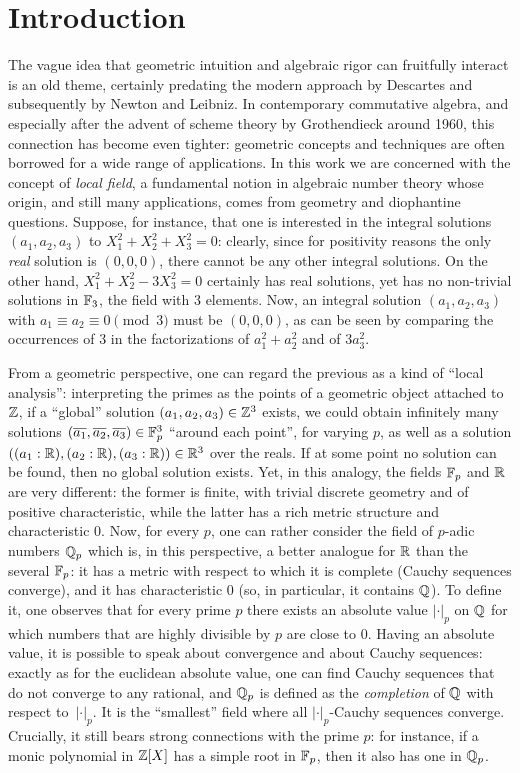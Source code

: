 \documentclass[sigplan,10pt, nonacm, review]{acmart}
\begin{document}
\section{Introduction}\label{sec:intro}
The vague idea that geometric intuition and algebraic rigor can fruitfully interact is an old theme, certainly predating the modern approach by Descartes and subsequently by Newton and Leibniz. 
In contemporary commutative algebra, and especially
after the advent of scheme theory by Grothendieck around 1960, this connection has become even tighter: geometric concepts and techniques are often borrowed for a wide range of applications. In this work we are concerned with the concept of \emph{local field}, a fundamental notion in algebraic number theory whose origin, and still many applications, comes from geometry and diophantine questions. Suppose, for instance, that one is interested in the integral solutions $(a_1,a_2,a_3)$ to $X_1^2+X_2^2+X_3^2=0$: clearly, since for positivity reasons the only \emph{real} solution is $(0,0,0)$, there cannot be any other integral solutions. On the other hand, $X_1^2+ X_2^2-3X_3^2=0$ certainly has real solutions, yet has no non-trivial solutions in $\FF[3]$, the field with $3$ elements. Now, an integral solution $(a_1,a_2,a_3)$ with $a_1\equiv a_2\equiv 0\pmod{3}$ must be $(0,0,0)$, as can be seen by comparing the occurrences of $3$ in the factorizations of $a_1^2+a_2^2$ and of $3a_3^2$. 

From a geometric perspective, one can regard the previous as a kind of ``local analysis'': interpreting the primes as the points of a geometric object attached to $\ZZ$, if a ``global'' solution $(a_1,a_2,a_3)\in\ZZ^3$ exists, we could obtain infinitely many solutions $(\overline{a_1},\overline{a_2},\overline{a_3})\in\FF^3$ ``around each point'', for varying $p$, as well as a solution $((a_1 : \RR),(a_2 : \RR),(a_3 : \RR))\in\RR^3$ over the reals. If at some point no solution can be found, then no global solution exists. Yet, in this analogy, the fields $\FF$ and $\RR$ are very different: the former is finite, with trivial discrete geometry and of positive characteristic, while the latter has a rich metric structure and characteristic $0$. Now, for every $p$, one can rather consider the field of $p$-adic numbers $\QQ_p$ which is, in this perspective, a better analogue for $\RR$ than the several $\FF$: it has a metric with respect to which it is complete (Cauchy sequences converge), and it has characteristic $0$ (so, in particular, it contains $\QQ$). To define it, one observes that for every prime $p$ there exists an absolute value $\lvert\cdot\rvert_p$ on $\QQ$ for which numbers that are highly divisible by $p$ are close to $0$. Having an absolute value, it is possible to speak about convergence and about Cauchy sequences: exactly as for the euclidean absolute value, one can find Cauchy sequences that do not converge to any rational, and $\QQ_p$ is defined as the \emph{completion} of $\QQ$ with respect to~$\lvert\cdot\rvert_p$. It is the ``smallest'' field where all $\lvert\cdot\rvert_p$-Cauchy sequences converge. Crucially, it still bears strong connections with the prime $p$: for instance, if a monic polynomial in $\ZZ[X]$ has a simple root in $\FF$, then it also has one in $\QQ_p$. 
\end{document}
